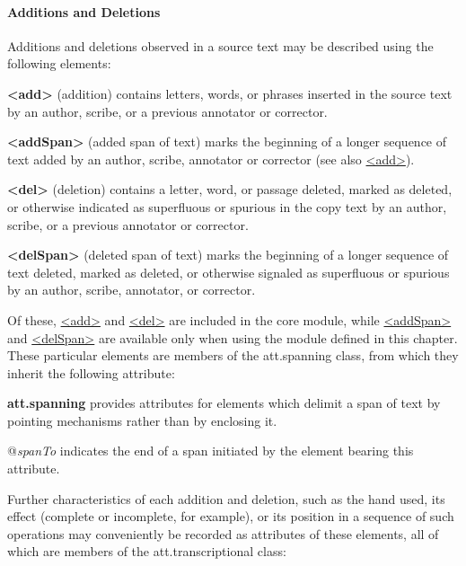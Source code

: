 \paragraph[{Additions and Deletions}]{Additions and Deletions}\label{PHAD}\par
Additions and deletions observed in a source text may be described using the following elements: 
\begin{sansreflist}
  
\item [\textbf{<add>}] (addition) contains letters, words, or phrases inserted in the source text by an author, scribe, or a previous annotator or corrector.
\item [\textbf{<addSpan>}] (added span of text) marks the beginning of a longer sequence of text added by an author, scribe, annotator or corrector (see also \hyperref[TEI.add]{<add>}).
\item [\textbf{<del>}] (deletion) contains a letter, word, or passage deleted, marked as deleted, or otherwise indicated as superfluous or spurious in the copy text by an author, scribe, or a previous annotator or corrector.
\item [\textbf{<delSpan>}] (deleted span of text) marks the beginning of a longer sequence of text deleted, marked as deleted, or otherwise signaled as superfluous or spurious by an author, scribe, annotator, or corrector.
\end{sansreflist}
 Of these, \hyperref[TEI.add]{<add>} and \hyperref[TEI.del]{<del>} are included in the core module, while \hyperref[TEI.addSpan]{<addSpan>} and \hyperref[TEI.delSpan]{<delSpan>} are available only when using the module defined in this chapter. These particular elements are members of the \textsf{att.spanning} class, from which they inherit the following attribute: 
\begin{sansreflist}
  
\item [\textbf{att.spanning}] provides attributes for elements which delimit a span of text by pointing mechanisms rather than by enclosing it.\hfil\\[-10pt]\begin{sansreflist}
    \item[@{\itshape spanTo}]
  indicates the end of a span initiated by the element bearing this attribute.
\end{sansreflist}  
\end{sansreflist}
\par
Further characteristics of each addition and deletion, such as the hand used, its effect (complete or incomplete, for example), or its position in a sequence of such operations may conveniently be recorded as attributes of these elements, all of which are members of the \textsf{att.transcriptional} class: 

